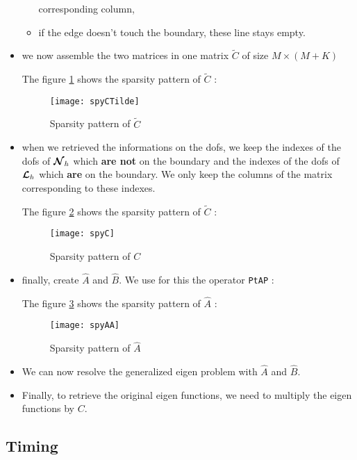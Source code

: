 \begin{itemize}
\begin{itemize}
    corresponding column,
  \item
    if the edge doesn't touch the boundary, these line stays empty. 
  \end{itemize}
  
\item
  we now assemble the two matrices in one matrix $\tilde{C}$ of size $M\times (M+K)$
  
  The figure \ref{spyCTilde} shows the sparsity pattern of $\tilde{C}$ : 
  \begin{figure}[H]
    \centering
    \texttt{[image: spyCTilde]}
    \caption{Sparsity pattern of $\tilde{C}$}
    \label{spyCTilde}
  \end{figure}
\item
  when we retrieved the informations on the dofs, we keep the indexes of the dofs of ${\bm{\mathcal{N}}}_h$ which {\bf are not} on the boundary and the indexes of the dofs of ${\bm{\mathcal{L}}}_h$ which {\bf are} on the boundary. We only keep the columns of the matrix corresponding to these indexes.
  
  The figure \ref{spyC} shows the sparsity pattern of $\tilde{C}$ : 
  \begin{figure}[H]
    \centering
    \texttt{[image: spyC]}
    \caption{Sparsity pattern of $C$}
    \label{spyC}
  \end{figure}
\item
  finally, create $\widehat{A}$ and $\widehat{B}$. We use for this the operator \texttt{PtAP} :
  
  The figure \ref{spyAA} shows the sparsity pattern of $\widehat{A}$ : 
  \begin{figure}[H]
    \centering
    \texttt{[image: spyAA]}
    \caption{Sparsity pattern of $\widehat{A}$}
    \label{spyAA}
  \end{figure}
\item
  We can now resolve the generalized eigen problem with $\widehat{A}$ and $\widehat{B}$.
\item
  Finally, to retrieve the original eigen functions, we need to multiply the eigen functions by $C$.
  
\end{itemize}

\subsection{Timing}

